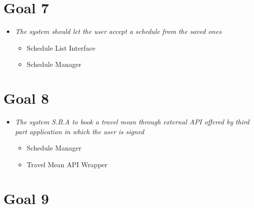 \section{Goal 7}

\begin{itemize}

\item \textit{The system should let the user accept a schedule from the saved ones}
\begin{itemize}
\item Schedule List Interface
\item Schedule Manager
\end{itemize}

\end{itemize}

\section{Goal 8}

\begin{itemize}

\item \textit{The system S.B.A to book a travel mean through external API offered by third part application in which the user is signed}
\begin{itemize}
\item Schedule Manager
\item Travel Mean API Wrapper
\end{itemize}

\end{itemize}


\section{Goal 9}

